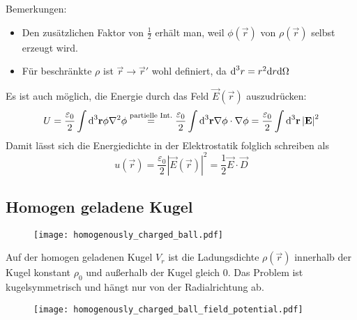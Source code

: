 Bemerkungen:
\begin{itemize}
	\item Den zusätzlichen Faktor von $\frac{1}{2}$ erhält man, weil $\phi \left(\vec {r}\right)$ von $\rho \left(\vec {r}\right)$ selbst erzeugt wird.

	\item Für beschränkte $\rho $ ist $\vec {r}\rightarrow \vec {r}'$ wohl definiert, da $\text{d} ^{3}r=r^{2}\text{d} r\text{d} \Omega  $


\end{itemize}
Es ist auch möglich, die Energie durch das Feld $\vec {E}\left(\vec {r}\right)$ auszudrücken:
\begin{equation*}
	U=\frac{\varepsilon _{0}}{2}\int \text{d} ^{3}\mathbf{r}\phi \nabla ^{2}\phi \overset{\text{partielle Int}.}{=}\frac{\varepsilon _{0}}{2}\int \text{d} ^{3}\mathbf{r}\nabla \phi \cdot \nabla \phi =\frac{\varepsilon _{0}}{2}\int \text{d} ^{3}\mathbf{r}\left| \mathbf{E}\right| ^{2}
\end{equation*}
Damit lässt sich die Energiedichte in der Elektrostatik folglich schreiben als
\begin{equation*}
	u\left(\vec {r}\right)=\frac{\varepsilon _{0}}{2}\left| \vec {E}\left(\vec {r}\right)\right| ^{2}=\frac{1}{2}\vec {E}\cdot \vec {D}
\end{equation*}
\subsection{Homogen geladene Kugel\label{ref-024}}



\begin{figure}[htb]
	\centering
	\texttt{[image: homogenously\_charged\_ball.pdf]}
	\caption{}
	\label{fig:homogenously_charged_ball}
\end{figure}

Auf der homogen geladenen Kugel $V_{r}$ ist die Ladungsdichte $\rho \left(\vec {r}\right)$ innerhalb der Kugel konstant $\rho _{0}$ und außerhalb der Kugel gleich $0$. Das Problem ist kugelsymmetrisch und hängt nur von der Radialrichtung ab.



\begin{figure}[htb]
	\centering
	\texttt{[image: homogenously\_charged\_ball\_field\_potential.pdf]}
	\caption{}
	\label{fig:homogenously_charged_ball_field_potential}
\end{figure}

